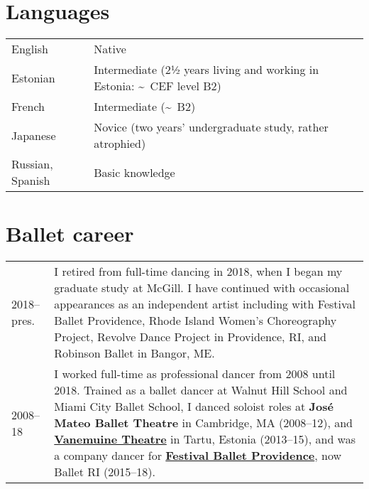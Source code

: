 \documentclass[11pt,a4paper]{article}
\begin{document}
  \section{Languages}

  \begin{longtable}[l]{ll}
    English
    &%
      Native\\
    Estonian 
    &%
      Intermediate (2½ years living and working in Estonia:
      \textasciitilde\ CEF level B2)\\
    French 
    &%
      Intermediate (\textasciitilde\ B2)\\
    Japanese
    &%
      Novice (two years' undergraduate study, rather atrophied)\\
    Russian, Spanish%
    &%
      Basic knowledge\\
  \end{longtable}

  \section{Ballet career}
  \begin{longtable}{p{1.7cm}|p{15cm}}
    2018--pres.
    &%
    I retired from full-time dancing in 2018, when I began my graduate study at
    McGill. I have continued with occasional appearances as an independent
    artist including with Festival Ballet Providence,  Rhode Island Women's
    Choreography Project,  Revolve Dance Project in Providence, RI,
    and Robinson Ballet in Bangor, ME.\\
    \textsc{2008--18}
    &%
    I worked full-time as professional dancer from 2008 until 2018. Trained as a
    ballet dancer at Walnut Hill School and Miami City Ballet School, I danced
    soloist roles at \textbf{José Mateo Ballet Theatre} in Cambridge, MA
    (2008--12), and \href{http://vanemuine.ee}{\textbf{Vanemuine Theatre}} in
    Tartu, Estonia (2013--15), and was a company dancer for
    \href{http://festivalballetprovidence.org}{\textbf{Festival Ballet
    Providence}}, now Ballet RI (2015--18).\\
  \end{longtable}

  
\end{document}
